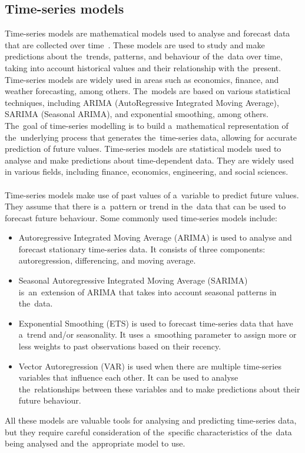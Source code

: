         \subsection{Time-series models}
        Time-series models are mathematical models used to analyse and forecast data
        that are collected over time~\cite{Cryer}. These models are used to study and
        make predictions about the~trends, patterns, and behaviour of the~data over
        time, taking into account historical values and their relationship with
        the~present. Time-series models are widely used in areas such as economics,
        finance, and weather forecasting, among others. The~models are based on
        various statistical techniques, including ARIMA (AutoRegressive Integrated
        Moving Average), SARIMA (Seasonal ARIMA), and exponential smoothing, among
        others. The~goal of time-series modelling is to build a~mathematical
        representation of the~underlying process that generates the~time-series data,
        allowing for accurate prediction of future values. Time-series models are
        statistical models used to analyse and make predictions about time-dependent
        data. They are widely used in various fields, including finance, economics,
        engineering, and social sciences.\\
    \\
    Time-series models make use of past values of a~variable to predict future values.
They assume that there is a~pattern or trend in the~data that can be used to forecast future behaviour.
Some commonly used time-series models include:
    \begin{itemize}
        \item Autoregressive Integrated Moving Average (ARIMA) is used to analyse and forecast stationary
        time-series data. It consists of three components: autoregression, differencing, and moving average.
        \item Seasonal Autoregressive Integrated Moving Average (SARIMA) is~an~extension of ARIMA
        that takes into account seasonal patterns in the~data.
        \item Exponential Smoothing (ETS) is used to forecast time-series data that have a~trend
        and/or seasonality. It uses a~smoothing parameter to assign more or less weights to past observations
        based on their recency.
        \item Vector Autoregression (VAR) is used when there are multiple time-series variables
        that influence each other. It can be used to analyse the~relationships between these variables and to make
        predictions about their future behaviour.
    \end{itemize}
All these models are valuable tools for analysing and predicting time-series data, but they require careful
        consideration of the~specific characteristics of the~data being analysed and the~appropriate model to use.


